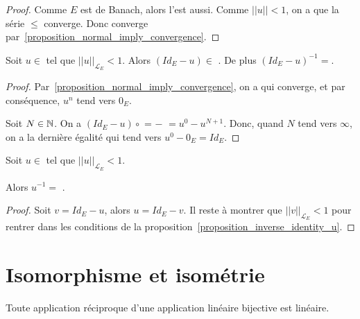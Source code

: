 \begin{proof}
	Comme $E$ est de Banach, alors  l'est aussi. Comme $||u||
	< 1$, on a que la série  $\leq$
	 converge. Donc
	 converge
	par~\ref{proposition_normal_imply_convergence}.
\end{proof}

\newcommand{\inverseU}[1]{\GSsum{n}{0}{\infty}{$(Id_{E} - #1)^{n}$}}

\begin{proposition}
\label{proposition_inverse_identity_u}
	Soit $u \in$  tel que $||u||_{\mathcal{L}_{E}} < 1$. Alors
	$(Id_{E} - u) \in$ . De plus $(Id_{E} - u)^{-1} =
	$.
\end{proposition}


\begin{proof}
	Par~\ref{proposition_normal_imply_convergence}, on a
	 qui converge, et par conséquence, $u^{n}$ tend
	vers $0_{E}$.

	Soit $N \in \mathbb{N}$. On a $(Id_{E} - u) \circ $ =
	 $ - $  $ = u^{0} - u^{N
	+ 1}$. Donc, quand $N$ tend vers $\infty$, on a la dernière égalité qui tend
	vers $u^{0} - 0_{E} = Id_{E}$.
\end{proof}

\begin{corollary}
	Soit $u \in$  tel que $||u||_{\mathcal{L}_{E}} < 1$.
	
	Alors $u^{-1} = $ .
\end{corollary}

\begin{proof}
	Soit $v = Id_{E} - u$, alors $u = Id_{E} - v$. Il reste à montrer que
	$||v||_{\mathcal{L}_{E}} < 1$ pour rentrer dans les conditions de la
	proposition~\ref{proposition_inverse_identity_u}.
\end{proof}


\section{Isomorphisme et isométrie}

\begin{proposition}
	Toute application réciproque d'une application linéaire bijective est
	linéaire.
\end{proposition}

